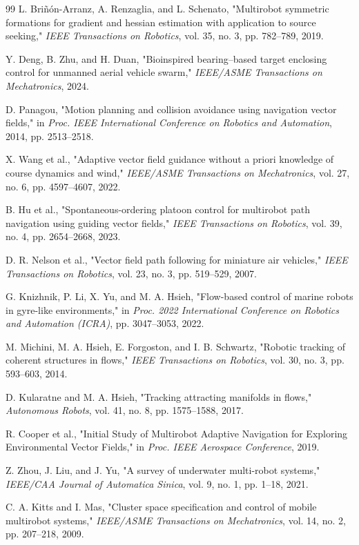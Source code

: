 \documentclass[lettersize,journal]{IEEEtran}
\begin{document}
\begin{thebibliography}{99}
 L. Briñón-Arranz, A. Renzaglia, and L. Schenato, "Multirobot symmetric formations for gradient and hessian estimation with application to source seeking," \textit{IEEE Transactions on Robotics}, vol. 35, no. 3, pp. 782--789, 2019.

 Y. Deng, B. Zhu, and H. Duan, "Bioinspired bearing–based target enclosing control for unmanned aerial vehicle swarm," \textit{IEEE/ASME Transactions on Mechatronics}, 2024.

 D. Panagou, "Motion planning and collision avoidance using navigation vector fields," in \textit{Proc. IEEE International Conference on Robotics and Automation}, 2014, pp. 2513--2518.

 X. Wang et al., "Adaptive vector field guidance without a priori knowledge of course dynamics and wind," \textit{IEEE/ASME Transactions on Mechatronics}, vol. 27, no. 6, pp. 4597--4607, 2022.

 B. Hu et al., "Spontaneous-ordering platoon control for multirobot path navigation using guiding vector fields," \textit{IEEE Transactions on Robotics}, vol. 39, no. 4, pp. 2654--2668, 2023.

 D. R. Nelson et al., "Vector field path following for miniature air vehicles," \textit{IEEE Transactions on Robotics}, vol. 23, no. 3, pp. 519--529, 2007.

 G. Knizhnik, P. Li, X. Yu, and M. A. Hsieh, "Flow-based control of marine robots in gyre-like environments," in \textit{Proc. 2022 International Conference on Robotics and Automation (ICRA)}, pp. 3047--3053, 2022.

 M. Michini, M. A. Hsieh, E. Forgoston, and I. B. Schwartz, "Robotic tracking of coherent structures in flows," \textit{IEEE Transactions on Robotics}, vol. 30, no. 3, pp. 593--603, 2014.

 D. Kularatne and M. A. Hsieh, "Tracking attracting manifolds in flows," \textit{Autonomous Robots}, vol. 41, no. 8, pp. 1575--1588, 2017.

 R. Cooper et al., "Initial Study of Multirobot Adaptive Navigation for Exploring Environmental Vector Fields," in \textit{Proc. IEEE Aerospace Conference}, 2019.

 Z. Zhou, J. Liu, and J. Yu, "A survey of underwater multi-robot systems," \textit{IEEE/CAA Journal of Automatica Sinica}, vol. 9, no. 1, pp. 1--18, 2021.

 C. A. Kitts and I. Mas, "Cluster space specification and control of mobile multirobot systems," \textit{IEEE/ASME Transactions on Mechatronics}, vol. 14, no. 2, pp. 207--218, 2009.


\end{thebibliography}
\end{document}
